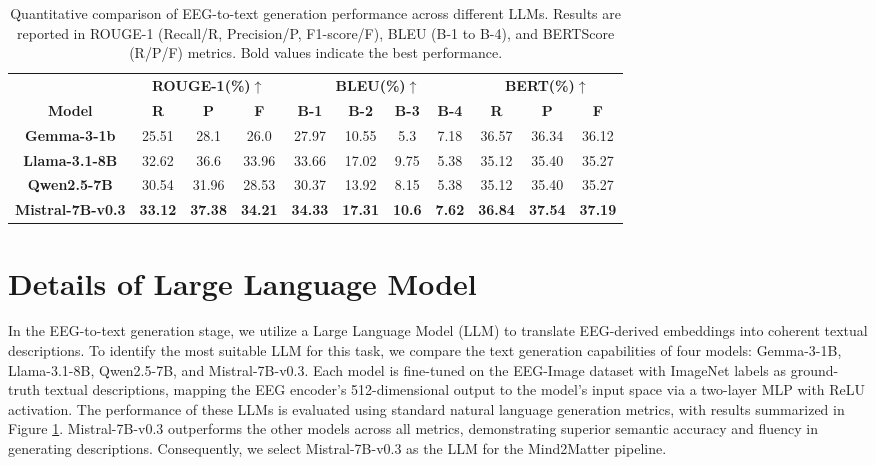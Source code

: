\documentclass[sigconf]{acmart}
\begin{document}
\begin{table}
\centering
\caption{Quantitative comparison of EEG-to-text generation performance across different LLMs. Results are reported in ROUGE-1 (Recall/R, Precision/P, F1-score/F), BLEU (B-1 to B-4), and BERTScore (R/P/F) metrics. Bold values indicate the best performance.}
\label{subt1}
\begin{tabular}{c c c c c c c c c c c}
\toprule
& \multicolumn{3}{c}{\textbf{ROUGE-1(\%)$\uparrow$}} & \multicolumn{4}{c}{\textbf{BLEU(\%)$\uparrow$}} & 
\multicolumn{3}{c}{\textbf{BERT(\%)$\uparrow$}}\\
{\textbf{Model}} & \textbf{R} & \textbf{P} & \textbf{F} & \textbf{B-1} & \textbf{B-2} & \textbf{B-3} & \textbf{B-4} &
\textbf{R} & \textbf{P} & \textbf{F}\\
\midrule
\textbf{Gemma-3-1b} &25.51 & 28.1 & 26.0 & 27.97 & 10.55 & 5.3 & 7.18 & 36.57 & 36.34 & 36.12 \\
\textbf{Llama-3.1-8B} &32.62 & 36.6 & 33.96 & 33.66 & 17.02 & 9.75 & 5.38 & 35.12 & 35.40 & 35.27\\
\textbf{Qwen2.5-7B} & 30.54 & 31.96 & 28.53 & 30.37 & 13.92 & 8.15 & 5.38 & 35.12 & 35.40 & 35.27\\
\textbf{Mistral-7B-v0.3} & \textbf{33.12} & \textbf{37.38} & \textbf{34.21} & \textbf{34.33} & \textbf{17.31} & \textbf{10.6} & \textbf{7.62} & \textbf{36.84} & \textbf{37.54} & \textbf{37.19}\\
\bottomrule
\end{tabular}
\end{table}

\section{Details of Large Language Model}
In the EEG-to-text generation stage, we utilize a Large Language Model (LLM) to translate EEG-derived embeddings into coherent textual descriptions. To identify the most suitable LLM for this task, we compare the text generation capabilities of four models: Gemma-3-1B, Llama-3.1-8B, Qwen2.5-7B, and Mistral-7B-v0.3. Each model is fine-tuned on the EEG-Image dataset with ImageNet labels as ground-truth textual descriptions, mapping the EEG encoder’s 512-dimensional output to the model’s input space via a two-layer MLP with ReLU activation. The performance of these LLMs is evaluated using standard natural language generation metrics, with results summarized in Figure \ref{subt1}. Mistral-7B-v0.3 outperforms the other models across all metrics, demonstrating superior semantic accuracy and fluency in generating descriptions. Consequently, we select Mistral-7B-v0.3 as the LLM for the Mind2Matter pipeline.
\end{document}
